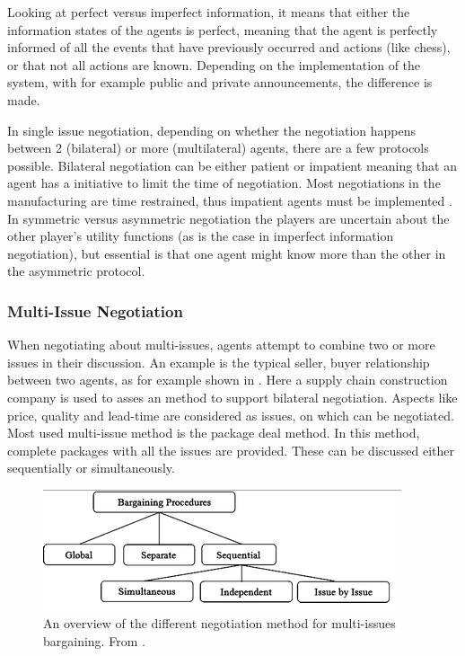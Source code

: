 Looking at perfect versus imperfect information, it means that either the information states of the agents is perfect, meaning that the agent is perfectly informed of all the events that have previously occurred and actions (like chess), or that not all actions are known. Depending on the implementation of the system, with for example public and private announcements, the difference is made. 

In single issue negotiation, depending on whether the negotiation happens between 2 (bilateral) or more (multilateral) agents, there are a few protocols possible. Bilateral negotiation can be either patient or impatient \citep{fatima2014negotiation} meaning that an agent has a initiative to limit the time of negotiation. Most negotiations in the manufacturing are time restrained, thus impatient agents must be implemented \citep{kraus1995multiagent}. In symmetric versus asymmetric negotiation the players are uncertain about the other player's utility functions (as is the case in imperfect information negotiation), but essential is that one agent might know more than the other in the asymmetric protocol.

\subsubsection{Multi-Issue Negotiation}
 When negotiating about multi-issues, agents attempt to combine two or more issues in their discussion. An example is the typical seller, buyer relationship between two agents, as for example shown in \citep{schramm2013bilateral}. Here a supply chain construction company is used to asses an method to support bilateral negotiation. Aspects like price, quality and lead-time are considered as issues, on which can be negotiated. Most used multi-issue method is the package deal method. In this method, complete packages with all the issues are provided. These can be discussed either sequentially or simultaneously. 

 \begin{figure}[h]
 	\centering
 	\includegraphics[width=0.7\linewidth]{img/multi-lateral}
 	\caption{An overview of the different negotiation method for multi-issues bargaining. From \citep{abedin2014agenda}.}
 	\label{fig:multilateral}
 \end{figure}
 
